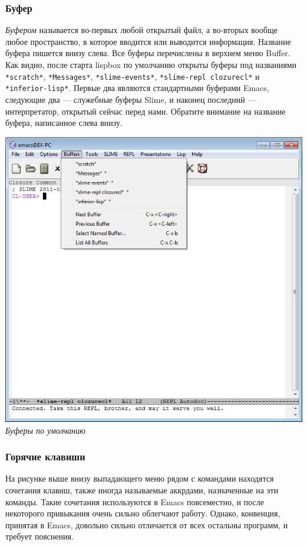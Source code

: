 \documentclass[a4paper, 12pt, titlepage, twoside]{article}
\begin{document}
\subsubsection{Буфер}
\textit{Буфером} называется во-первых любой открытый файл, а во-вторых вообще любое пространство, в которое вводится или выводится информация. Название буфера пишется внизу слева. Все буферы перечислены в верхнем меню Buffer. Как видно, после старта lispbox по умолчанию открыты буферы под названиями \verb|*scratch*|, \verb|*Messages*|, \verb|*slime-events*|, \verb|*slime-repl clozurecl*| и \verb|*inferior-lisp*|. Первые два являются стандартными буферами Emacs, следующие два --- служебные буферы Slime, и наконец последний --- интерпретатор, открытый сейчас перед нами. Обратите внимание на название буфера, написанное слева внизу.
\begin{center}
  \includegraphics[scale=.6]{lispbox_buffers}\\
  \small{\textit{Буферы по умолчанию}}
\end{center}
\subsubsection{Горячие клавиши}
На рисунке выше внизу выпадающего меню рядом с командами находятся сочетания клавиш, также иногда называемые аккрдами, назначенные на эти команды.
Такие сочетания используются в Emacs повсеместно, и после некоторого привыкания очень сильно облегчают работу. Однако, конвенция, принятая в Emacs, довольно сильно отличается от всех остальны программ, и требует пояснения.
\end{document}
